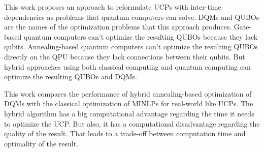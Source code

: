 This work proposes an approach to reformulate UCPs with inter-time dependencies as problems that quantum computers can solve.
DQMs and QUBOs are the names of the optimization problems that this approach produces.
Gate-based quantum computers can't optimize the resulting QUBOs because they lack qubits.
Annealing-based quantum computers can't optimize the resulting QUBOs directly on the QPU because they lack connections between their qubits.
But hybrid approaches using both classical computing and quantum computing can optimize the resulting QUBOs and DQMs.

This work compares the performance of hybrid annealing-based optimization of DQMs with the classical optimization of MINLPs for real-world like UCPs.
The hybrid algorithm has a big computational advantage regarding the time it needs to optimize the UCP.
But also, it has a computational disadvantage regarding the quality of the result.
That leads to a trade-off between computation time and optimality of the result.
